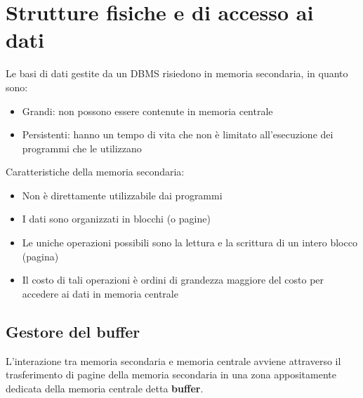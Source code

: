 \documentclass[a4paper, 10pt]{article}
\theoremstyle{definition}
\begin{document}
	\section{Strutture fisiche e di accesso ai dati}
	
	Le basi di dati gestite da un DBMS risiedono in
	memoria secondaria, in quanto sono:
	\begin{itemize}
		\item Grandi: non possono essere contenute in memoria centrale
		\item Persistenti: hanno un tempo di vita che non è limitato
		all'esecuzione dei programmi che le utilizzano
	\end{itemize}
	Caratteristiche della memoria secondaria:
	\begin{itemize}
		\item Non è direttamente utilizzabile dai programmi
		\item I dati sono organizzati in blocchi (o pagine)
		\item Le uniche operazioni possibili sono la lettura e la scrittura di
		un intero blocco (pagina)
		\item Il costo di tali operazioni è ordini di grandezza maggiore del
		costo per accedere ai dati in memoria centrale
	\end{itemize}
	
	\subsection{Gestore del buffer}
		L'interazione tra memoria secondaria e memoria
		centrale avviene attraverso il trasferimento di pagine
		della memoria secondaria in una zona appositamente
		dedicata della memoria centrale detta \textbf{buffer}.
		
\end{document}
